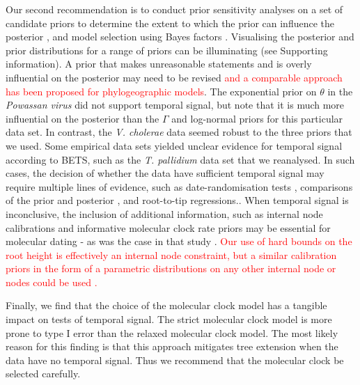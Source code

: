 \documentclass[10pt,letterpaper]{article}
\begin{document}
Our second recommendation is to conduct prior sensitivity analyses on a set of candidate priors to determine the extent to which the prior can influence the posterior \cite{foster2017evaluating, lopes2011confronting}, and model selection using Bayes factors \cite{lambert2018student}. Visualising the posterior and prior distributions for a range of priors can be illuminating (see Supporting information). A prior that makes unreasonable statements and is overly influential on the posterior may need to be revised \textcolor{red}{and a comparable approach has been proposed for phylogeographic models\cite{gao2023model, gao2023prioritree}}. The exponential prior on $\theta$ in the \textit{Powassan virus} did not support temporal signal, but note that it is much more influential on the posterior than the $\Gamma$ and log-normal priors for this particular data set. In contrast, the \textit{V. cholerae} data seemed robust to the three priors that we used. Some empirical data sets yielded unclear evidence for temporal signal according to BETS, such as the \textit{T. pallidium} data set that we reanalysed. In such cases, the decision of whether the data have sufficient temporal signal may require multiple lines of evidence, such as date-randomisation tests \cite{duchene2015performance, ramsden2009hantavirus}, comparisons of the prior and posterior \cite{duchene2020estimating}, and root-to-tip regressions.\cite{featherstone2023clockor2, rambaut2016exploring}. When temporal signal is inconclusive, the inclusion of additional information, such as internal node calibrations and informative molecular clock rate priors may be essential for molecular dating - as was the case in that study \cite{majander2020ancient}. \textcolor{red}{Our use of hard bounds on the root height is effectively an internal node constraint, but a similar calibration priors in the form of a parametric distributions on any other internal node or nodes could be used \cite{duchene2014impact, warnock2015calibration}.}

Finally, we find that the choice of the molecular clock model has a tangible impact on tests of temporal signal. The strict molecular clock model is more prone to type I error than the relaxed molecular clock model. The most likely reason for this finding is that this approach mitigates tree extension when the data have no temporal signal. Thus we recommend that the molecular clock be selected carefully.

\end{document}
